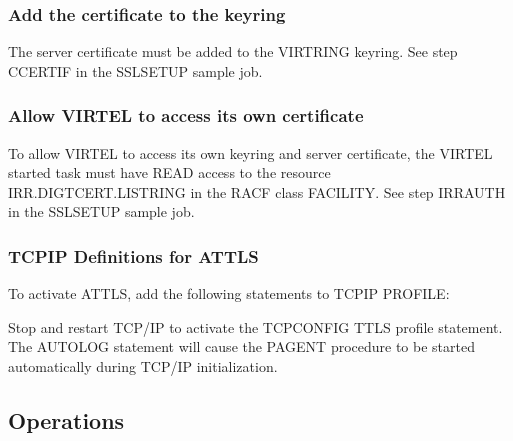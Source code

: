 \documentclass[letterpaper,10pt,english]{sphinxmanual}
\begin{document}
\subsubsection{Add the certificate to the keyring}
\label{\detokenize{Customization:add-the-certificate-to-the-keyring}}
\sphinxAtStartPar
The server certificate must be added to the VIRTRING keyring. See step CCERTIF in the SSLSETUP sample job.


\subsubsection{Allow VIRTEL to access its own certificate}
\label{\detokenize{Customization:allow-virtel-to-access-its-own-certificate}}
\sphinxAtStartPar
To allow VIRTEL to access its own keyring and server certificate, the VIRTEL started task must have READ access to the resource IRR.DIGTCERT.LISTRING in the RACF class FACILITY. See step IRRAUTH in the SSLSETUP sample job.

\ignorespaces 

\subsubsection{TCPIP Definitions for AT\sphinxhyphen{}TLS}
\label{\detokenize{Customization:tcpip-definitions-for-at-tls}}\label{\detokenize{Customization:index-102}}
\sphinxAtStartPar
To activate AT\sphinxhyphen{}TLS, add the following statements to TCPIP PROFILE:

\begin{sphinxVerbatim}[commandchars=\\\{\}]
 
   
\end{sphinxVerbatim}

\sphinxAtStartPar
Stop and restart TCP/IP to activate the TCPCONFIG TTLS profile statement. The AUTOLOG statement will cause the PAGENT procedure to be started automatically during TCP/IP initialization.

\ignorespaces 

\subsection{Operations}
\label{\detokenize{Customization:operations}}\label{\detokenize{Customization:index-103}}
\end{document}
